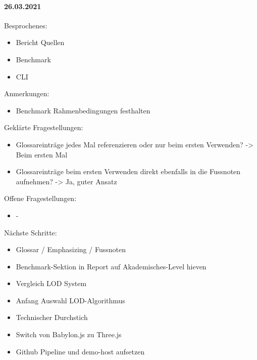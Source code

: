 \paragraph{26.03.2021}
Besprochenes:
\begin{itemize}
  \item Bericht
    \subitem Quellen
  \item Benchmark
  \item CLI
\end{itemize}
Anmerkungen:
\begin{itemize}
  \item Benchmark
    \subitem Rahmenbedingungen festhalten
\end{itemize}
Geklärte Fragestellungen:
\begin{itemize}
  \item Glossareinträge jedes Mal referenzieren oder nur beim ersten Verwenden? -> Beim ersten Mal
  \item Glossareinträge beim ersten Verwenden direkt ebenfalls in die Fussnoten aufnehmen? -> Ja, guter Ansatz
\end{itemize}
Offene Fragestellungen:
\begin{itemize}
  \item -
\end{itemize}
Nächste Schritte:
\begin{itemize}
  \item Glossar / Emphasizing / Fussnoten
  \item Benchmark-Sektion in Report auf Akademisches-Level hieven
  \item Vergleich LOD System
  \item Anfang Auswahl LOD-Algorithmus
  \item Technischer Durchstich
  \item Switch von Babylon.js zu Three.js
  \item Github Pipeline und demo-host aufsetzen
\end{itemize}

\newpage

